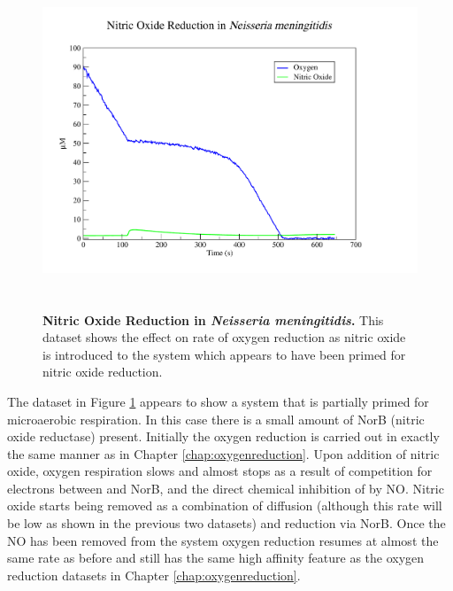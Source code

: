 \begin{figure}[tbp]
 \centering
 \includegraphics[height=10cm, trim=2cm 1cm 4cm 1cm]{./06-noreduction/data/aer-no-data.pdf}
 \caption[{Nitric Oxide Reduction in \textit{Neisseria meningitidis}.}]{{\bf Nitric Oxide Reduction in \textit{Neisseria meningitidis}.} This dataset shows the effect on rate of oxygen reduction as nitric oxide is introduced to the system which appears to have been primed for nitric oxide reduction.}
 \label{fig:nodata}
\end{figure}
The dataset in Figure \ref{fig:nodata} appears to show a system that is partially primed for microaerobic respiration. In this case there is a small amount of NorB (nitric oxide reductase) present. Initially the oxygen reduction is carried out in exactly the same manner as in Chapter \ref{chap:oxygenreduction}. Upon addition of nitric oxide, oxygen respiration slows and almost stops as a result of competition for electrons between \cbbthree{} and NorB, and the direct chemical inhibition of \cbbthree{} by NO. Nitric oxide starts being removed as a combination of diffusion (although this rate will be low as shown in the previous two datasets) and reduction via NorB. Once the NO has been removed from the system oxygen reduction resumes at almost the same rate as before and still has the same high affinity feature as the oxygen reduction datasets in Chapter \ref{chap:oxygenreduction}.
